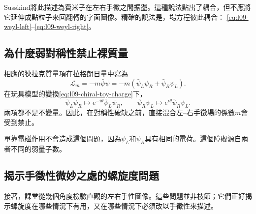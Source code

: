 Susskind將此描述為費米子在左右手徵之間振盪。這種說法點出了耦合，但不應將它延伸成點粒子來回翻轉的字面圖像。精確的說法是，場方程彼此耦合：
\eqref{eq:l09-weyl-left}--\eqref{eq:l09-weyl-right}。

\begin{classroomqa}
\end{classroomqa}

\subsection{為什麼弱對稱性禁止裸質量}

相應的狄拉克質量項在拉格朗日量中寫為
\begin{equation}
  \mathcal L_m
  =-m\bar\psi\psi
  =-m\left(\bar\psi_L\psi_R+\bar\psi_R\psi_L\right).
  \label{eq:l09-bare-dirac-mass}
\end{equation}
在玩具模型的變換\eqref{eq:l09-chiral-toy-charge}下，
\begin{equation}
  \bar\psi_L\psi_R\longmapsto
  e^{-i\theta}\bar\psi_L\psi_R,
  \qquad
  \bar\psi_R\psi_L\longmapsto
  e^{i\theta}\bar\psi_R\psi_L.
\end{equation}
兩項都不是不變量。因此，在對稱性破缺之前，直接混合左--右手徵場的係數\(m\)會受到禁止。

單靠電磁作用不會造成這個問題，因為\(\psi_L\)和\(\psi_R\)具有相同的電荷。這個障礙源自兩者不同的弱量子數。

\subsection{揭示手徵性微妙之處的螺旋度問題}

接著，課堂從幾個角度檢驗直觀的左右手性圖像。這些問題並非枝節；它們正好揭示螺旋度在哪些情況下有用，又在哪些情況下必須改以手徵性來描述。

\begin{classroomqa}
\end{classroomqa}

